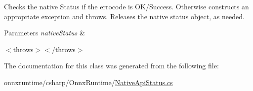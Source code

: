 Checks the native Status if the errocode is O\+K/\+Success. Otherwise constructs an appropriate exception and throws. Releases the native status object, as needed. 


\begin{DoxyParams}{Parameters}
{\em native\+Status} & \\
\hline
\end{DoxyParams}
$<$throws$>$$<$/throws$>$ 

The documentation for this class was generated from the following file\+:\begin{DoxyCompactItemize}
\item 
onnxruntime/csharp/\+Onnx\+Runtime/\mbox{\hyperlink{OnnxRuntime_2NativeApiStatus_8cs}{Native\+Api\+Status.\+cs}}\end{DoxyCompactItemize}
